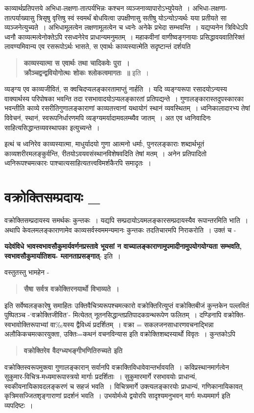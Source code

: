{काव्यार्थप्रतिपत्तये अभिधा-लक्षणा-तात्पर्यभिन्नः कश्चन व्यञ्जनाव्यापारोऽभ्युपेयते~। अभिधा-लक्षणा-तात्पर्याख्यासु त्रिसृषु वृत्तिषु स्वं स्वमर्थं बोधयित्वा उपक्षीणासु सतीषु योऽन्योऽप्यर्थः यया प्रतीयते सा व्यञ्जनेत्युच्यते~। अभिधामूलत्वेन लक्षणामूलत्वेन च ध्वनेः अनेके प्रभेदा सम्भवन्ति~। यद्यप्यनेन त्रिविधेऽपि ध्वनौ काव्यत्मत्वेनोक्तेऽपि रसध्वनेरेव प्राधान्यमनुमतम्~। महाकवीनां वाणीष्वङ्गनायाः प्रसिद्धावयवातिरिक्तं लावण्यमिवान्य एव रसरूपोऽर्थः भासते, स एवार्थः काव्यस्यात्मेति सदृष्टान्तं दर्शयति 

\begin{verse}
\textbf{काव्यस्यात्मा स एवार्थः तथा चादिकवेः पुरा~। \\
क्रौञ्चद्वन्द्ववियोगोत्थः शोकः श्लोकत्वमागतः~॥} इति~। 
\end{verse}
व्यङ्ग्य एव काव्यजीवितं, स क्वचिदप्यलङ्कारतामाप्तुं नार्हति~। यदि व्यङ्ग्यरूपा रसादयोऽन्यस्य वाक्यार्थस्य परिपोषका भवन्ति तदा रसभावादयोऽप्यलङ्कारतां प्रतिपद्यन्ते~। गुणालङ्कारास्तदुपस्कारका भवन्तीति काव्ये रसरीतिगुणालङ्काराणां काव्यतत्त्वानां यथायोगं स्थानं व्यवस्थितम्~। ध्वनिकालादारभ्य तेषां विवेचनं, स्थानं, स्वरूपनिर्धारणमपि व्यङ्ग्यमर्यादामवलम्ब्यैव जातम्~। अत एव ध्वनिवादिनः साहित्यसिद्धान्तव्यवस्थापका इत्युच्यन्ते~। 

इत्थं च ध्वनिरेव काव्यस्यात्मा, माधुर्यादयो गुणा आत्मनो धर्माः, पुनरलङ्काराः शब्दार्थभूतं काव्यशरीरमलङ्कुर्वन्ति, रीतयोऽवयवसंस्थानविशेषवदिति तेषां मतम्~। अनेन प्रतिपादितो ध्वनिरूपश्चमत्कारः पाश्चात्यसाहित्यतत्त्वविमर्शकैरपि समादृतः~। 

\section*{ वक्रोक्तिसम्प्रदायः \_} 

वक्रोक्तिसम्प्रदायस्य समर्थकः कुन्तकः~। यद्यपि सम्प्रदायोऽयमलङ्कारसम्प्रदायस्यैव रूपान्तरमिति भाति~। अथापि केवलमलङ्काराणामेव काव्यसर्वस्वममन्यमानः कुन्तकः तदतिचारमपि निराकरोति~। उक्तं च - 

\textbf{यदेवंविधे भावस्वभावसौकुमार्यवर्णनप्रस्तावे भूयसां न वाच्यालङ्काराणामुपमादीनामुपयोगयोग्यता सम्भवति, स्वभावसौ\-कुमार्यातिशय- म्लानताप्रसङ्गात्}- इति~। 

वस्तुतस्तु भामहेन - 
\begin{verse}
\textbf{सैषा सर्वत्र वक्रोक्तिरनयार्थो विभाव्यते~। }
\end{verse}
इति सर्वेष्वलङ्कारेषु समाहितः उक्तिवैचित्र्यरूपश्चमत्कारो वक्रोक्तिरित्युप्तं वक्रोक्तिबीजं कुन्तकेन पल्लवितं पुष्पितञ्च -‘वक्रोक्तिजीवित’- मित्येतत् नूतनसिद्धान्तप्रतिपादकग्रन्थरूपेण फलितम्~। दण्डिनापि वक्रोक्ति-स्वभावोक्तिरूपाभ्यां वा‰यस्य द्वैविध्यं प्रदर्शितम्~। वक्रा = सकलजनसाधारणवचनाद्भिन्ना अलौकिकचमत्कारयुक्ता, उक्तिः=कथनं वचनविन्यास इति वक्रोक्तिशब्दस्यार्थो विवृतः~। कुन्तकोऽपि
\begin{verse}
\textbf{वक्रोक्तिरेव वैदग्ध्यभङ्गीभणितिरुच्यते इति }
\end{verse}
वक्रोक्तिस्वरूपमुक्त्वा गुणालङ्कारान् सर्वानपि वक्राक्तिविधावेवान्तर्भावयति~। कविप्रस्थानमार्गत्वेन सुकुमार-विचित्र-मध्यमारूपास्त्रयो मार्गाः प्रदर्शिताः~। सुकुमारमार्गे रसभावयोः प्राधान्यं, स्वकीयनायिकावदलङ्करणं च सहजं भवति~। विचित्रमार्गे उक्त्यलङ्कारयोः प्राधान्यं, गणिकानायिकावत् कृत्रिमसज्जितशृङ्गाराणां प्रदर्शनं भवति~। उभयोर्मध्ये द्वयोरपि सादृश्यमनुभवन् मार्गः मध्यममार्ग इति व्यपदिष्टः~। 

}
